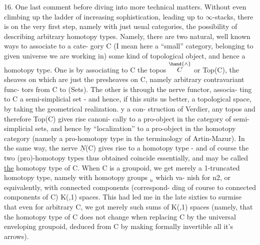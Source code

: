 

 16. One last comment before diving into more technical matters. Without
even climbing up the ladder of increasing sophistication, leading up
to $\infty$-stacks, there is on the very first step, namely with just usual
categories, the possibility of describing arbitrary homotopy types.
Namely, there are two natural, well known ways to associate to a cate-%
gory C (I mean here a ``small'' category, belonging to  given universe
we are working in) some kind of topological object, and hence a homotopy
type. One is by associating to C the topos $\overset{\hand{\wedge}}{C}$ or Top(C), the sheaves on
which are just the presheaves on C, namely arbitrary contravariant func-%
tors from C to (Sets). The other is through the nerve functor, associa-%
ting to C a semi-simplicial set - and hence, if this suits us better,
a topological space, by taking the geometrical realization. y a con-%
struction of Verdier, any topos and therefore Top(C) gives rise canoni-%
cally to a pro-object in the category of semi-simplicial sets, and hence
by ``localization'' to a pro-object in the homotopy category (namely a
pro-homotopy type in the terminology of Artin-Mazur). In the same way,
the nerve $\underline{N}$(C) gives rise to a homotopy type - and of course the two
(pro)-homotopy types thus obtained coincide essentially, and may be
called \uline{the} homotopy type of C. When C is a groupoid, we get merely
a 1-truncated homotopy type, namely with homotopy groups \hand{$\pi$}$_n$ which va-%
nish for n\hand{$\geqslant$}2, or equivalently, with connected components (correspond-%
ding of course to connected components of C) K(\hand{$\pi$},1) spaces. This had
led me  in the late sixties to  surmise that even for arbitrary C, we got
merely such sums of K(\hand{$\pi$},1) spaces (namely, that the homotopy type of C
does not change when replacing C by the universal enveloping groupoid,
deduced from C by  making formally invertible all it's arrows).
